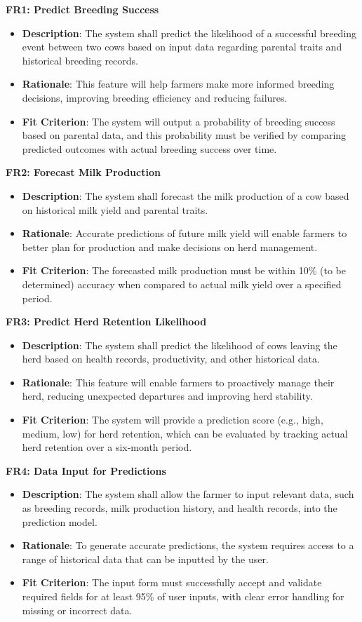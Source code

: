 \documentclass[12pt]{article}
\begin{document}
\textbf{FR1: Predict Breeding Success}
\begin{itemize}
    \item \textbf{Description}: The system shall predict the likelihood of a 
    successful breeding event between two cows based on input data regarding 
    parental traits and historical breeding records.
    \item \textbf{Rationale}: This feature will help farmers make more informed 
    breeding decisions, improving breeding efficiency and reducing failures.
    \item \textbf{Fit Criterion}: The system will output a probability of 
    breeding success based on parental data, and this probability must be 
    verified by comparing predicted outcomes with actual breeding success over time.
\end{itemize}
\textbf{FR2: Forecast Milk Production}
\begin{itemize}
    \item \textbf{Description}: The system shall forecast the milk production 
    of a cow based on historical milk yield and parental traits.
    \item \textbf{Rationale}: Accurate predictions of future milk yield will 
    enable farmers to better plan for production and make decisions on herd management.
    \item \textbf{Fit Criterion}: The forecasted milk production must be within 
    10\% (to be determined) accuracy when compared to actual milk yield over a specified period.
\end{itemize}
\textbf{FR3: Predict Herd Retention Likelihood}
\begin{itemize}
    \item \textbf{Description}: The system shall predict the likelihood of 
    cows leaving the herd based on health records, productivity, and other 
    historical data.
    \item \textbf{Rationale}: This feature will enable farmers to proactively 
    manage their herd, reducing unexpected departures and improving herd stability.
    \item \textbf{Fit Criterion}: The system will provide a prediction score 
    (e.g., high, medium, low) for herd retention, which can be evaluated by 
    tracking actual herd retention over a six-month period.
\end{itemize}
\textbf{FR4: Data Input for Predictions}
\begin{itemize}
    \item \textbf{Description}: The system shall allow the farmer to input 
    relevant data, such as breeding records, milk production history, and 
    health records, into the prediction model.
    \item \textbf{Rationale}: To generate accurate predictions, the system 
    requires access to a range of historical data that can be inputted by the user.
    \item \textbf{Fit Criterion}: The input form must successfully accept and 
    validate required fields for at least 95\% of user inputs, with clear error 
    handling for missing or incorrect data.
\end{itemize}
\end{document}
